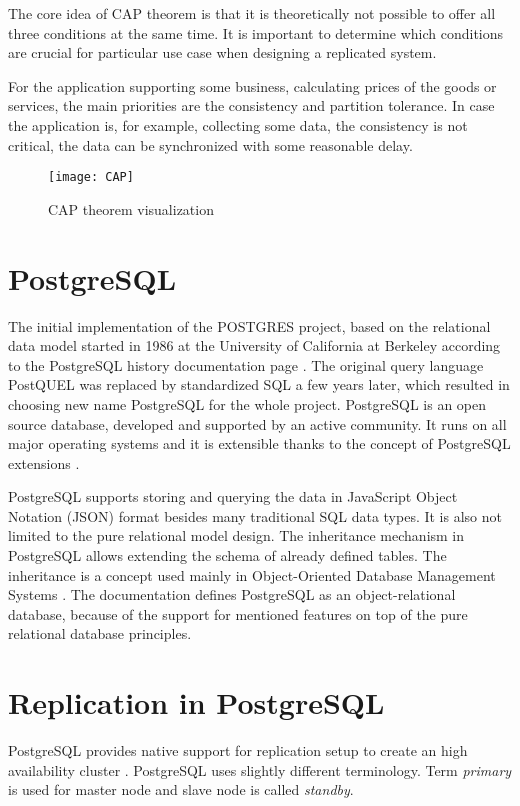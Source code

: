 \documentclass[
  digital, %
  twoside, %
  table,   %
  lof,     %
  lot,     %
]{fithesis3}
\begin{document}
The core idea of CAP theorem is that it is theoretically not possible to offer all three conditions at the same time. It is important to determine which conditions are crucial for particular use case when designing a replicated system.

For the application supporting some business, calculating prices of the goods or services, the main priorities are the consistency and partition tolerance. In case the application is, for example, collecting some data, the consistency is not critical, the data can be synchronized with some reasonable delay.

\begin{figure}[H]
\caption{CAP theorem visualization}
\centering
\texttt{[image: CAP]}
\label{fig:cap}
\end{figure}

\section{PostgreSQL} \label{sec:postgresql}
The initial implementation of the POSTGRES project, based on the relational data model started in 1986 at the University of California at Berkeley according to the PostgreSQL history documentation page \cite{pg_history}. The original query language PostQUEL was replaced by standardized SQL a few years later, which resulted in choosing new name PostgreSQL for the whole project. PostgreSQL is an open source database, developed and supported by an active community. It runs on all major operating systems and it is extensible thanks to the concept of PostgreSQL extensions \cite{pg_extensions}.

PostgreSQL supports storing and querying the data in JavaScript Object Notation (JSON) format besides many traditional SQL data types. It is also not limited to the pure relational model design. The inheritance mechanism in PostgreSQL \cite{inheritance} allows extending the schema of already defined tables. The inheritance is a concept used mainly in Object-Oriented Database Management Systems \cite{oodbms}. The documentation defines PostgreSQL as an object-relational database, because of the support for mentioned features on top of the pure relational database principles.

\section{Replication in PostgreSQL} \label{sec:pg_replication}
PostgreSQL provides native support for replication setup to create an high availability cluster \cite{pg_ha}. PostgreSQL uses slightly different terminology. Term \textit{primary} is used for master node and slave node is called \textit{standby}.
\end{document}

